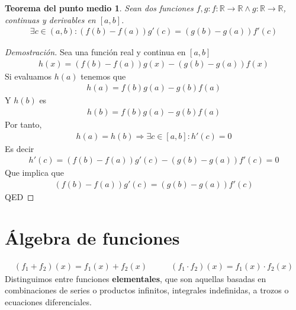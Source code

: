 \documentclass{article}
\newtheorem{midval}{Teorema del punto medio}
\begin{document}
\begin{midval}
    Sean dos funciones $f,g : f: \mathbb{R} \to \mathbb{R} \wedge g: \mathbb{R} \to \mathbb{R}$, continuas y derivables en $[a,b]$.
    \begin{equation}
        \begin{split}
            \exists c \in (a,b): (f(b)-f(a))g'(c) = (g(b) - g(a))f'(c)
        \end{split}
    \end{equation}
\end{midval}
\begin{proof}[Demostración]
    Sea una función real y continua en $[a,b]$
    \begin{equation}
        \begin{split}
            h(x)= (f(b)-f(a))g(x)- (g(b)-g(a))f(x)
        \end{split}
    \end{equation}
    Si evaluamos $h(a)$ tenemos que
    \begin{equation}
        \begin{split}
            h(a)= f(b)g(a)-g(b)f(a)
        \end{split}
    \end{equation}
    Y $h(b)$ es
    \begin{equation}
        \begin{split}
            h(b)=f(b)g(a)-g(b)f(a)
        \end{split}
    \end{equation}
    Por tanto,
    \begin{equation}
        \begin{split}
            h(a)=h(b)\Rightarrow \exists c \in [a,b] : h'(c)=0
        \end{split}
    \end{equation}
    Es decir
    \begin{equation}
        \begin{split}
            h'(c)=(f(b)-f(a))g'(c)- (g(b)-g(a))f'(c)=0
        \end{split}
    \end{equation}
    Que implica que
    \begin{equation}
        \begin{split}
            (f(b)-f(a))g'(c)=(g(b)-g(a))f'(c)
        \end{split}
    \end{equation}
    QED
\end{proof}
\section{Álgebra de funciones}
\begin{equation}
    \begin{split}
        (f_1+f_2)(x)=f_1(x)+f_2(x)
    \end{split}
    \quad\quad
    \begin{split}
        (f_1 \cdot f_2)(x)=f_1(x) \cdot f_2(x)
    \end{split}
\end{equation}
Distinguimos entre funciones \textbf{elementales}, que son aquellas basadas en combinaciones de series o productos infinitos,
integrales indefinidas, a trozos o ecuaciones diferenciales.
\end{document}
